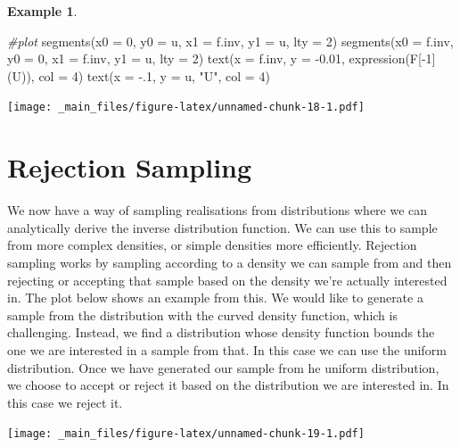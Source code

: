 \documentclass[
]{book}
\newenvironment{Shaded}{\begin{snugshade}}{\end{snugshade}}
\newcommand{\AttributeTok}[1]{\textcolor[rgb]{0.77,0.63,0.00}{#1}}
\newcommand{\CommentTok}[1]{\textcolor[rgb]{0.56,0.35,0.01}{\textit{#1}}}
\newcommand{\DecValTok}[1]{\textcolor[rgb]{0.00,0.00,0.81}{#1}}
\newcommand{\FloatTok}[1]{\textcolor[rgb]{0.00,0.00,0.81}{#1}}
\newcommand{\FunctionTok}[1]{\textcolor[rgb]{0.00,0.00,0.00}{#1}}
\newcommand{\NormalTok}[1]{#1}
\newcommand{\SpecialCharTok}[1]{\textcolor[rgb]{0.00,0.00,0.00}{#1}}
\newcommand{\StringTok}[1]{\textcolor[rgb]{0.31,0.60,0.02}{#1}}
\theoremstyle{definition}
\theoremstyle{definition}
\newtheorem{example}{Example}[chapter]
\theoremstyle{definition}
\theoremstyle{definition}
\theoremstyle{remark}
\begin{document}
\begin{example}
\begin{Shaded}
\begin{Highlighting}[]
\CommentTok{\#plot }
\FunctionTok{segments}\NormalTok{(}\AttributeTok{x0 =} \DecValTok{0}\NormalTok{, }\AttributeTok{y0 =}\NormalTok{ u, }\AttributeTok{x1 =}\NormalTok{ f.inv, }\AttributeTok{y1 =}\NormalTok{ u, }\AttributeTok{lty =} \DecValTok{2}\NormalTok{)}
\FunctionTok{segments}\NormalTok{(}\AttributeTok{x0 =}\NormalTok{ f.inv, }\AttributeTok{y0 =} \DecValTok{0}\NormalTok{, }\AttributeTok{x1 =}\NormalTok{ f.inv, }\AttributeTok{y1 =}\NormalTok{ u, }\AttributeTok{lty =} \DecValTok{2}\NormalTok{)}
\FunctionTok{text}\NormalTok{(}\AttributeTok{x =}\NormalTok{ f.inv, }\AttributeTok{y =} \SpecialCharTok{{-}}\FloatTok{0.01}\NormalTok{, }\FunctionTok{expression}\NormalTok{(F[}\SpecialCharTok{{-}}\DecValTok{1}\NormalTok{](U)), }\AttributeTok{col =} \DecValTok{4}\NormalTok{)}
\FunctionTok{text}\NormalTok{(}\AttributeTok{x =} \SpecialCharTok{{-}}\NormalTok{.}\DecValTok{1}\NormalTok{, }\AttributeTok{y =}\NormalTok{ u, }\StringTok{"U"}\NormalTok{, }\AttributeTok{col =} \DecValTok{4}\NormalTok{)}
\end{Highlighting}
\end{Shaded}

\texttt{[image: \_main\_files/figure-latex/unnamed-chunk-18-1.pdf]}
\end{example}

\hypertarget{rejection-sampling}{%
\section{Rejection Sampling}\label{rejection-sampling}}

We now have a way of sampling realisations from distributions where we can analytically derive the inverse distribution function. We can use this to sample from more complex densities, or simple densities more efficiently. Rejection sampling works by sampling according to a density we can sample from and then rejecting or accepting that sample based on the density we're actually interested in. The plot below shows an example from this. We would like to generate a sample from the distribution with the curved density function, which is challenging. Instead, we find a distribution whose density function bounds the one we are interested in a sample from that. In this case we can use the uniform distribution. Once we have generated our sample from he uniform distribution, we choose to accept or reject it based on the distribution we are interested in. In this case we reject it.

\texttt{[image: \_main\_files/figure-latex/unnamed-chunk-19-1.pdf]}
\end{document}
